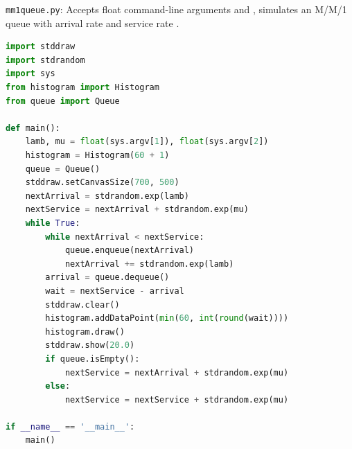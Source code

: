 \documentclass[8pt,a4paper,compress,handout]{beamer}
\begin{document}
\begin{frame}[fragile]
\begin{framed}
\tiny \lstinline{mm1queue.py}: Accepts float command-line arguments  and , simulates an M/M/1 queue with arrival rate  and service rate .
\end{framed}

\begin{lstlisting}[language=Python]
import stddraw
import stdrandom
import sys
from histogram import Histogram
from queue import Queue

def main():
    lamb, mu = float(sys.argv[1]), float(sys.argv[2])
    histogram = Histogram(60 + 1)
    queue = Queue()
    stddraw.setCanvasSize(700, 500)
    nextArrival = stdrandom.exp(lamb)
    nextService = nextArrival + stdrandom.exp(mu) 
    while True:
        while nextArrival < nextService:
            queue.enqueue(nextArrival)
            nextArrival += stdrandom.exp(lamb)
        arrival = queue.dequeue()
        wait = nextService - arrival
        stddraw.clear()
        histogram.addDataPoint(min(60, int(round(wait))))
        histogram.draw()
        stddraw.show(20.0)
        if queue.isEmpty():
            nextService = nextArrival + stdrandom.exp(mu)
        else:
            nextService = nextService + stdrandom.exp(mu)

if __name__ == '__main__':
    main()

\end{lstlisting}
\end{frame}
\end{document}
